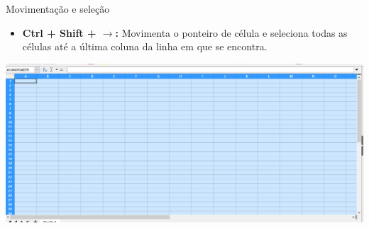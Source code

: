 \begin{frame}{Movimentação e seleção}
	\begin{block}{}
		\begin{itemize}
			\item \textbf{Ctrl + Shift + $\bm{\to}$:} Movimenta o ponteiro de célula e seleciona todas as células até a última coluna da linha em que se encontra.
		\end{itemize}
	\end{block}
	
	\medskip
	
	\centering
	\includegraphics[width=1\linewidth]{Figuras/Ch06/fig16}
\end{frame}


